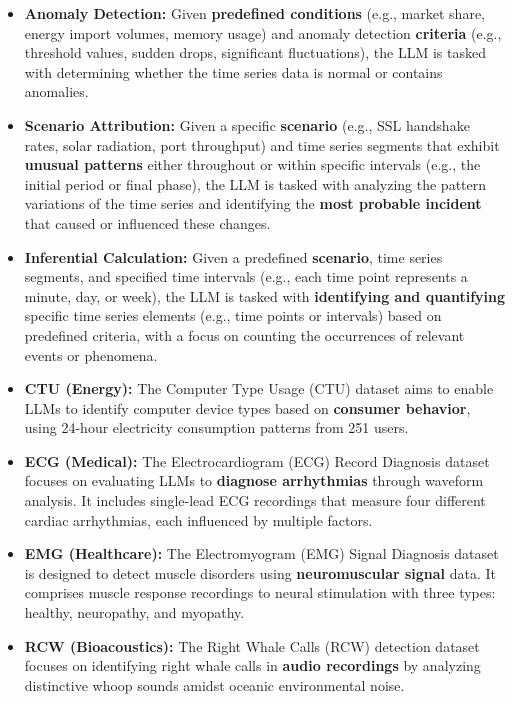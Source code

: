 \documentclass{article}
\theoremstyle{plain}
\theoremstyle{definition}
\theoremstyle{remark}
\begin{document}
\begin{itemize}[leftmargin=*]
\item \textbf{Anomaly Detection:} Given \textbf{predefined conditions} (e.g., market share, energy import volumes, memory usage) and anomaly detection \textbf{criteria} (e.g., threshold values, sudden drops, significant fluctuations), the LLM is tasked with determining whether the time series data is normal or contains anomalies.
\item \textbf{Scenario Attribution:} Given a specific \textbf{scenario} (e.g., SSL handshake rates, solar radiation, port throughput) and time series segments that exhibit \textbf{unusual patterns} either throughout or within specific intervals (e.g., the initial period or final phase), the LLM is tasked with analyzing the pattern variations of the time series and identifying the \textbf{most probable incident} that caused or influenced these changes.
\item \textbf{Inferential Calculation:} Given a predefined \textbf{scenario}, time series segments, and specified time intervals (e.g., each time point represents a minute, day, or week), the LLM is tasked with \textbf{identifying and quantifying} specific time series elements (e.g., time points or intervals) based on predefined criteria, with a focus on counting the occurrences of relevant events or phenomena. 
\item \textbf{CTU (Energy):} The Computer Type Usage (CTU) dataset aims to enable LLMs to identify computer device types based on \textbf{consumer behavior}, using 24-hour electricity consumption patterns from 251 users. 
\item \textbf{ECG (Medical):} The Electrocardiogram (ECG) Record Diagnosis dataset focuses on evaluating LLMs to \textbf{diagnose arrhythmias} through waveform analysis. It includes single-lead ECG recordings that measure four different cardiac arrhythmias, each influenced by multiple factors. 
\item \textbf{EMG (Healthcare):} The Electromyogram (EMG) Signal Diagnosis dataset is designed to detect muscle disorders using \textbf{neuromuscular signal} data. It comprises muscle response recordings to neural stimulation with three types: healthy, neuropathy, and myopathy.
\item \textbf{RCW (Bioacoustics):} The Right Whale Calls (RCW) detection dataset focuses on identifying right whale calls in \textbf{audio recordings} by analyzing distinctive whoop sounds amidst oceanic environmental noise. 
\end{itemize}
\end{document}
